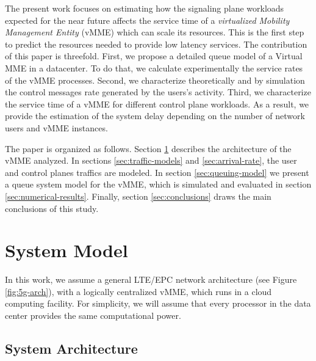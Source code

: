 \documentclass[conference]{IEEEtran}
\begin{document}
  The present work focuses on estimating how the signaling plane workloads expected for the near future affects the service time of a \emph{virtualized Mobility Management Entity} (vMME) which can scale its resources. This is the first step to predict the resources needed to provide low latency services.
  The contribution of this paper is threefold. First, we propose a detailed queue model of a Virtual MME in a datacenter. To do that, we calculate experimentally the service rates of the vMME processes. Second, we characterize theoretically and by simulation the control messages rate generated by the users's activity. Third, we characterize the service time of a vMME for different control plane workloads. As a result, we provide the estimation of the system delay depending on the number of network users and vMME instances.
  













The paper is organized as follows. Section \ref{sec:system-model} describes the architecture of the vMME analyzed. In sections \ref{sec:traffic-models} and \ref{sec:arrival-rate}, the user and control planes traffics are modeled. In section \ref{sec:queuing-model} we present a queue system model for the vMME, which is simulated and evaluated in section \ref{sec:numerical-results}. Finally, section \ref{sec:conclusions} draws the main conclusions of this study.















\section{System Model}
\label{sec:system-model}


 In this work, we assume a general LTE/EPC network architecture (see Figure \ref{fig:5g-arch}), with a logically centralized vMME, which runs in a cloud computing facility. For simplicity, we will assume that every processor in the data center provides the same computational power.

\subsection{System Architecture}
\end{document}
